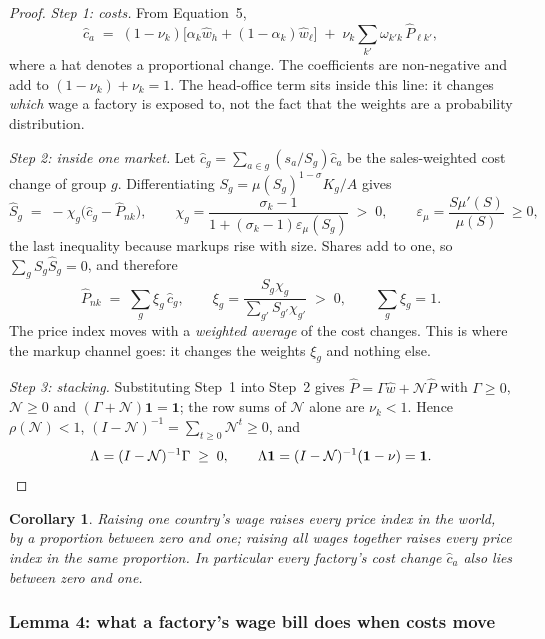 \documentclass[11pt]{article}
\theoremstyle{plain}
\newtheorem{corollary}{Corollary}
\theoremstyle{remark}
\theoremstyle{definition}
\begin{document}
\begin{proof}
\emph{Step 1: costs.} From Equation~5,
\[
  \hat c_a \;=\; (1-\nu_k)\big[\alpha_k\hat w_h+(1-\alpha_k)\hat w_\ell\big]
             \;+\;\nu_k\sum_{k'}\omega_{k'k}\,\hat P_{\ell k'},
\]
where a hat denotes a proportional change. The coefficients are non-negative and add
to $(1-\nu_k)+\nu_k=1$. The head-office term sits inside this line: it changes
\emph{which} wage a factory is exposed to, not the fact that the weights are a
probability distribution.

\emph{Step 2: inside one market.} Let $\hat c_g=\sum_{a\in g}(s_a/S_g)\hat c_a$ be the
sales-weighted cost change of group $g$. Differentiating
$S_g=\mu(S_g)^{1-\sigma}K_g/A$ gives
\[
  \hat S_g \;=\; -\chi_g\big(\hat c_g-\hat P_{nk}\big),
  \qquad
  \chi_g=\frac{\sigma_k-1}{1+(\sigma_k-1)\varepsilon_\mu(S_g)}\;>\;0,
  \qquad \varepsilon_\mu=\frac{S\mu'(S)}{\mu(S)}\ \ge 0 ,
\]
the last inequality because markups rise with size. Shares add to one, so
$\sum_g S_g\hat S_g=0$, and therefore
\[
  \hat P_{nk} \;=\; \sum_g \xi_g\,\hat c_g,
  \qquad
  \xi_g=\frac{S_g\chi_g}{\sum_{g'}S_{g'}\chi_{g'}}\;>\;0,\qquad \sum_g\xi_g=1 .
\]
The price index moves with a \emph{weighted average} of the cost changes. This is
where the markup channel goes: it changes the weights $\xi_g$ and nothing else.

\emph{Step 3: stacking.} Substituting Step~1 into Step~2 gives
$\hat P=\Gamma\hat w+\mathcal N\hat P$ with $\Gamma\ge0$, $\mathcal N\ge0$ and
$(\Gamma+\mathcal N)\mathbf 1=\mathbf 1$; the row sums of $\mathcal N$ alone are
$\nu_k<1$. Hence $\rho(\mathcal N)<1$, $(I-\mathcal N)^{-1}=\sum_{t\ge0}\mathcal N^t\ge0$,
and
\[
  \Lambda=(I-\mathcal N)^{-1}\Gamma\;\ge\;0,
  \qquad
  \Lambda\mathbf 1=(I-\mathcal N)^{-1}(\mathbf 1-\nu)=\mathbf 1 . \qedhere
\]
\end{proof}

\begin{corollary}
Raising one country's wage raises every price index in the world, by a proportion
between zero and one; raising all wages together raises every price index in the same
proportion. In particular every factory's cost change $\hat c_a$ also lies between
zero and one.
\end{corollary}

\subsubsection{Lemma 4: what a factory's wage bill does when costs move}
\end{document}
